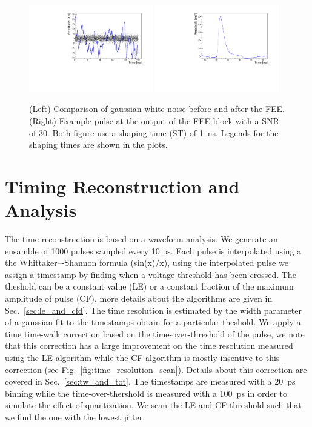\documentclass[preprint,1p]{elsarticle}
\begin{document}
\begin{figure}[htbp]
  \centering
  \includegraphics[width=0.48\textwidth]{figs/noise_vs_shaped_noise.pdf} \hfill
  \includegraphics[width=0.48\textwidth]{figs/lgad_pre_rad_st_1ns_snr_30.pdf}
  \caption{(Left) Comparison of gaussian white noise before and after the FEE.
  (Right) Example pulse at the output of the FEE block with a SNR of 30. Both figure use a shaping time (ST) of 1~\si{ns}. Legends for the shaping times are shown in the plots.}
  \label{fig:noise}
\end{figure}

\section{Timing Reconstruction and Analysis}\label{sec:timing_and_analysis}
The time reconstruction is based on a waveform analysis. We generate an ensamble of 1000 pulses sampled every 10 ps.
Each pulse is interpolated using a the Whittaker–-Shannon formula (sin(x)/x), using the interpolated pulse we assign a timestamp by finding when
a voltage threshold has been crossed. The theshold can be a constant value (LE) or a constant fraction of the maximum amplitude of pulse (CF),
more details about the algorithms are given in Sec.~\ref{sec:le_and_cfd}. The time resolution is estimated by the width parameter of a gaussian fit
to the timestamps obtain for a particular theshold. We apply a time time-walk correction based on the time-over-threshold of the pulse,
we note that this correction has a large improvement on the time resolution measured using the LE algorithm while the CF algorithm is mostly
insentive to this correction (see Fig.~\ref{fig:time_resolution_scan}). Details about this correction are covered in Sec.~\ref{sec:tw_and_tot}. The timestamps are measured with a
20~\si{ps} binning while the time-over-thershold is measured with a 100~\si{ps} in order to simulate the effect of quantization. We scan
the LE and CF threshold such that we find the one with the lowest jitter.
\end{document}
